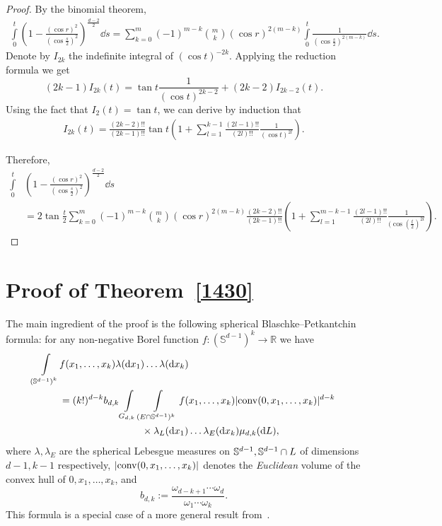 \documentclass[12pt, reqno]{amsart}
\begin{document}
\begin{proof}
By the binomial theorem,
\begin{align*}
    \int\limits_0^t \left(1 - \frac{(\cos r) ^2}{(\cos \frac{s}{2}) ^2}\right)^{\frac{d-2}{2}} \dd s = \sum_{k = 0}^{m}(-1)^{m-k}\binom{m}{k}(\cos r)^{2(m-k)}\int\limits_0^t\frac{1}{(\cos \frac{s}{2})^{2(m-k)}} \dd s.
\end{align*}
Denote by $I_{2k}$ the indefinite integral of ${(\cos t)^{-2k}}$.
Applying the reduction formula we get 
\begin{equation*}
    (2k-1)I_{2k}(t) = \tan t\frac{1}{(\cos t)^{2k - 2}} + (2k - 2)I_{2k - 2}(t).
\end{equation*}
Using the fact that $I_2(t) = \tan t$,  we can derive by induction that
\begin{align*}
    I_{2k}(t) = \frac{(2k - 2)!!}{(2k - 1)!!}\tan t\left(1 + \sum_{l = 1}^{k-1}\frac{(2l - 1)!!}{(2l)!!}\frac{1}{(\cos t)^{2l}}\right).
\end{align*}

Therefore, 
\begin{align*}
    \int\limits_0^t &\left(1 - \frac{(\cos r) ^2}{(\cos \frac{s}{2}) ^2}\right)^{\frac{d-2}{2}} \dd s \\
    &= 2 \tan \frac{t}{2}\sum_{k = 0}^{m}(-1)^{m-k}\binom{m}{k}(\cos r)^{2(m-k)}\frac{(2k - 2)!!}{(2k - 1)!!}\left(1 + \sum_{l = 1}^{m - k - 1}\frac{(2l - 1)!!}{(2l)!!}\frac{1}{(\cos (\frac{t}{2})^{2l}}\right).
\end{align*}


\end{proof}

\section{Proof of Theorem~\ref{1430}}
The main ingredient of the proof is the following spherical Blaschke--Petkantchin formula: for any non-negative Borel function $f:(\mathbb{S}^{d-1})^k\to \mathbb{R}$ we have
\begin{align}
\label{blashke-petkanchin}
       \int\limits_{\left( \mathbb{S}^{d-1}\right)^k} &f(x_1,\dots,x_k)\lambda(\mathrm d x_1)\dots \lambda(\mathrm d x_k)
       \\\notag
       &= (k!)^{d-k}b_{d,k}\int\limits_{G_{d,k}}
       \int\limits_{(E \cap \mathbb{S}^{d-1})^{k}} f(x_1,\dots,x_k) |\conv(0,x_1,\dots,x_k)|^{d-k}
       \\\notag
       &\hphantom{k!b_{d,k}\int\limits_{G_{d,k}}
       \int\limits_{(E \cap \mathbb{S}^{d-1})^{k}}}\times\lambda_{L}( \mathrm d x_1)\dots \lambda_{E}(\mathrm d x_k)\mu_{d,k}(\mathrm d L),
\end{align}
where $\lambda,\lambda_E$ are the spherical Lebesgue measures on $\mathbb{S}^{d-1}, \mathbb{S}^{d-1}\cap L$ of dimensions $d-1, k-1$ respectively, $|{\mathrm{conv}}(0,x_1,\dots,x_k)|$ denotes the \emph{Euclidean} volume of the convex hull of $0,x_1,\dots,x_k$, and
\begin{equation*}
    b_{d,k} := \frac{\omega_{d-k+1}\cdots \omega_{d}}{\omega_{1}\cdots \omega_{k}}.
\end{equation*}
This formula is a special case of a more general result from~\cite{AZ91}.
\end{document}

